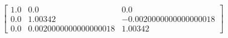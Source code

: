 \documentclass[preview]{standalone}
\begin{document}
\begin{align*}
\left[ \begin{array}{ccc}1.0 & 0.0 & 0.0 \\ 0.0 & 1.00342 & -0.0020000000000000018 \\ 0.0 & 0.0020000000000000018 & 1.00342\end{array} \right]
\end{align*}
\end{document}
